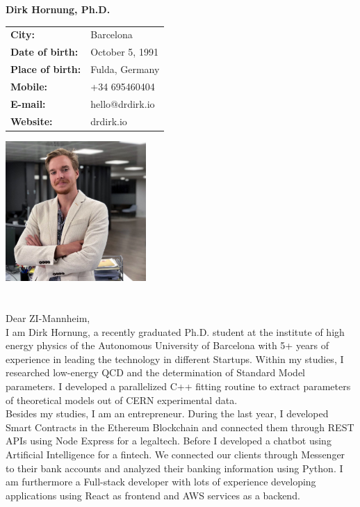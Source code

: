 \documentclass[11pt]{article}
\begin{document}
\Large
\noindent
\textbf{Dirk Hornung, Ph.D.} \\

\normalsize
\noindent
\begin{minipage}{0.5\linewidth}
  \begin{tabularx}{0.6\textwidth}{>{\bfseries}l l}
    City:           & Barcelona \\
    Date of birth:  & October 5, 1991\\
    Place of birth: & Fulda, Germany \\
    Mobile:         & +34 695460404 \\
    E-mail:         & hello@drdirk.io \\
    Website:      	& drdirk.io
  \end{tabularx}
\end{minipage}
\begin{minipage}{0.5\linewidth}
  \begin{flushright}
    \includegraphics[width=0.4\textwidth]{dirk.png}
  \end{flushright}
\end{minipage}

 \section*{}
 \vspace{1cm}
 Dear ZI-Mannheim, \\

 \noindent I am Dirk Hornung, a recently graduated Ph.D. student at the institute
 of high energy physics of the Autonomous University of Barcelona with 5+ years
 of experience in leading the technology in different Startups. Within my
 studies, I researched low-energy QCD and the determination of Standard Model
 parameters. I developed a parallelized C++ fitting routine to extract parameters of
 theoretical models out of CERN experimental data. \\

 \noindent Besides my studies, I am an entrepreneur. During the last year, I
 developed Smart Contracts in the Ethereum Blockchain and connected them through
 REST APIs using Node Express for a legaltech. Before I developed a chatbot using
 Artificial Intelligence for a fintech. We connected our clients through
 Messenger to their bank accounts and analyzed their banking information using
 Python. I am furthermore a Full-stack developer with lots of experience
 developing applications using React as frontend and AWS services as a backend.  \\
\end{document}
